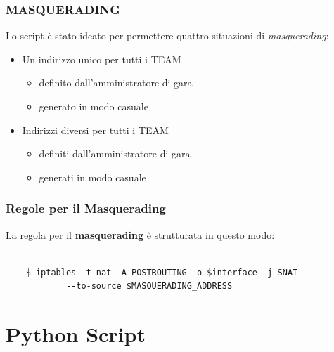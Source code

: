 \documentclass{beamer}
\begin{document}
\begin{frame}
    \frametitle{MASQUERADING}
    Lo script è stato ideato per permettere quattro situazioni di \textit{masquerading}:
    \begin{itemize}
        \item <1-> Un indirizzo unico per tutti i TEAM
        \begin{itemize}
            \item<2-> definito dall'amministratore di gara
            \item<3-> generato in modo casuale
        \end{itemize}
        \item<4-> Indirizzi diversi per tutti i TEAM
        \begin{itemize}
            \item <5-> definiti dall'amministratore di gara
            \item <6-> generati in modo casuale
        \end{itemize}
    \end{itemize}
\end{frame}

\begin{frame}[fragile]
    \frametitle{Regole per il Masquerading}

    La regola per il \textbf{masquerading} è strutturata in questo modo:
    \\~\\
    \begin{lstlisting}
    $ iptables -t nat -A POSTROUTING -o $interface -j SNAT 
            --to-source $MASQUERADING_ADDRESS
    \end{lstlisting}
\end{frame}

\section{Python Script}
\end{document}
